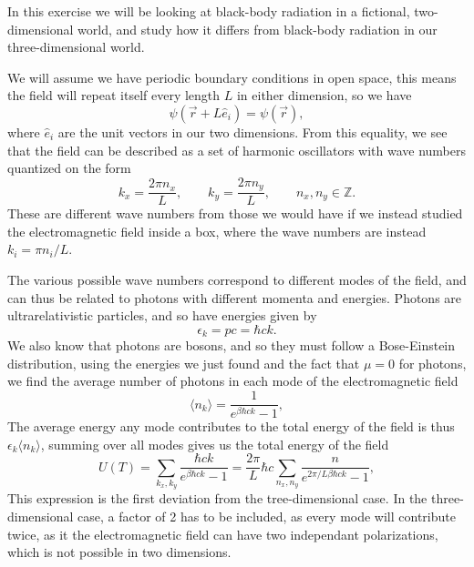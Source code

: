 \documentclass[a4paper, 11pt, notitlepage, english]{article}
\newcommand{\eps}{\epsilon}
\begin{document}
In this exercise we will be looking at black-body radiation in a fictional, two-dimensional world, and study how it differs from black-body radiation in our three-dimensional world.

We will assume we have periodic boundary conditions in open space, this means the field will repeat itself every length $L$ in either dimension, so we have
$$\psi(\vec{r} + L\hat{e}_i) = \psi(\vec{r}),$$
where $\hat{e}_i$ are the unit vectors in our two dimensions. From this equality, we see that the field can be described as a set of harmonic oscillators with wave numbers quantized on the form
$$k_x = \frac{2\pi n_x}{L}, \qquad k_y = \frac{2\pi n_y}{L}, \qquad n_x, n_y \in \mathbb{Z}.$$
These are different wave numbers from those we would have if we instead studied the electromagnetic field inside a box, where the wave numbers are instead $k_i = \pi n_i/L$.

The various possible wave numbers correspond to different modes of the field, and can thus be related to photons with different momenta and energies. Photons are ultrarelativistic particles, and so have energies given by
$$\eps_k = pc = \hbar c k.$$
We also know that photons are bosons, and so they must follow a Bose-Einstein distribution, using the energies we just found and the fact that $\mu=0$ for photons, we find the average number of photons in each mode of the electromagnetic field
$$\langle n_k\rangle = \frac{1}{e^{\beta\hbar c k} - 1},$$
The average energy any mode contributes to the total energy of the field is thus $\eps_k \langle n_k \rangle$, summing over all modes gives us the total energy of the field
$$U(T) = \sum_{k_x, k_y} \frac{\hbar c k}{e^{\beta \hbar c k} - 1} = \frac{2\pi}{L} \hbar c \sum_{n_x, n_y} \frac{n}{e^{2\pi/L\beta\hbar c k} - 1},$$
This expression is the first deviation from the tree-dimensional case. In the three-dimensional case, a factor of 2 has to be included, as every mode will contribute twice, as it the electromagnetic field can have two independant polarizations, which is not possible in two dimensions.
\end{document}
